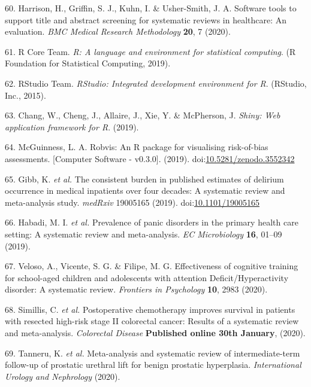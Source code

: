 \documentclass[a4paper, twoside]{templates/ociamthesis}
\begin{document}
\leavevmode\hypertarget{ref-harrison2020software}{}%
60. Harrison, H., Griffin, S. J., Kuhn, I. \& Usher-Smith, J. A. Software tools to support title and abstract screening for systematic reviews in healthcare: An evaluation. \emph{BMC Medical Research Methodology} \textbf{20}, 7 (2020).

\leavevmode\hypertarget{ref-rref}{}%
61. R Core Team. \emph{R: A language and environment for statistical computing}. (R Foundation for Statistical Computing, 2019).

\leavevmode\hypertarget{ref-rstudioref}{}%
62. RStudio Team. \emph{RStudio: Integrated development environment for R}. (RStudio, Inc., 2015).

\leavevmode\hypertarget{ref-shinyref}{}%
63. Chang, W., Cheng, J., Allaire, J., Xie, Y. \& McPherson, J. \emph{Shiny: Web application framework for R}. (2019).

\leavevmode\hypertarget{ref-mcguinness2019a}{}%
64. McGuinness, L. A. Robvis: An R package for visualising risk-of-bias assessments. {[}Computer Software - v0.3.0{]}. (2019). doi:\href{https://doi.org/10.5281/zenodo.3552342}{10.5281/zenodo.3552342}

\leavevmode\hypertarget{ref-gibb2019consistent}{}%
65. Gibb, K. \emph{et al.} The consistent burden in published estimates of delirium occurrence in medical inpatients over four decades: A systematic review and meta-analysis study. \emph{medRxiv} 19005165 (2019). doi:\href{https://doi.org/10.1101/19005165}{10.1101/19005165}

\leavevmode\hypertarget{ref-habadi2019prevalence}{}%
66. Habadi, M. I. \emph{et al.} Prevalence of panic disorders in the primary health care setting: A systematic review and meta-analysis. \emph{EC Microbiology} \textbf{16}, 01--09 (2019).

\leavevmode\hypertarget{ref-veloso2020effectiveness}{}%
67. Veloso, A., Vicente, S. G. \& Filipe, M. G. Effectiveness of cognitive training for school-aged children and adolescents with attention Deficit/Hyperactivity disorder: A systematic review. \emph{Frontiers in Psychology} \textbf{10}, 2983 (2020).

\leavevmode\hypertarget{ref-simillis2020}{}%
68. Simillis, C. \emph{et al.} Postoperative chemotherapy improves survival in patients with resected high-risk stage II colorectal cancer: Results of a systematic review and meta-analysis. \emph{Colorectal Disease} \textbf{Published online 30th January}, (2020).

\leavevmode\hypertarget{ref-tanneru2020}{}%
69. Tanneru, K. \emph{et al.} Meta-analysis and systematic review of intermediate-term follow-up of prostatic urethral lift for benign prostatic hyperplasia. \emph{International Urology and Nephrology} (2020).
\end{document}
